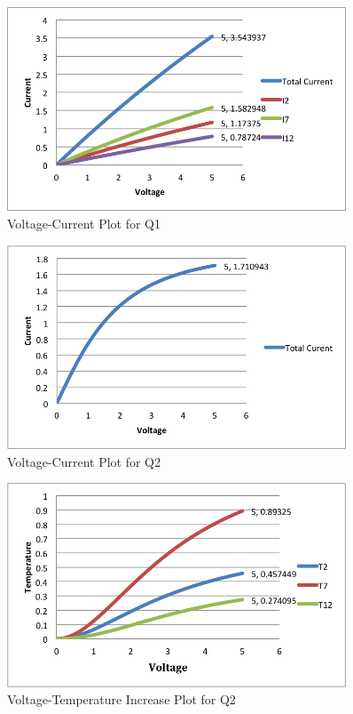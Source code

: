 \documentclass[12pt,a4paper]{article}
\begin{document}
\begin{figure}[h!]
  \centering
     \includegraphics[width=0.9\textwidth]{./q1.png}
  \caption{Voltage-Current Plot for Q1}
\end{figure}
\newpage
\begin{figure}[h!]
  \centering
     \includegraphics[width=0.9\textwidth]{./q21.png}
  \caption{Voltage-Current Plot for Q2}
\end{figure}
\begin{figure}[h!]
  \centering
     \includegraphics[width=0.9\textwidth]{./q22.png}
  \caption{Voltage-Temperature Increase Plot for Q2}
\end{figure}
\end{document}
